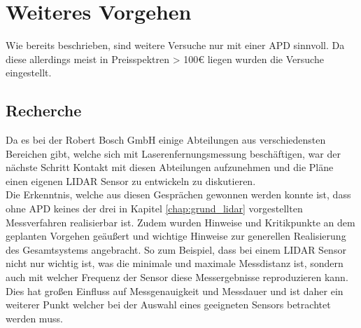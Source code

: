 \section{Weiteres Vorgehen}
Wie bereits beschrieben, sind weitere Versuche nur mit einer \ac{APD} sinnvoll. Da diese allerdings meist in Preisspektren > 100€ liegen wurden die Versuche eingestellt.
\subsection{Recherche}
Da es bei der Robert Bosch GmbH einige Abteilungen aus verschiedensten Bereichen gibt, welche sich mit Laserenfernungsmessung beschäftigen, war der nächste Schritt Kontakt mit diesen Abteilungen aufzunehmen und die Pläne einen eigenen \ac{LIDAR} Sensor zu entwickeln zu diskutieren. \\ 
Die Erkenntnis, welche aus diesen Gesprächen gewonnen werden konnte ist, dass ohne \ac{APD} keines der drei in Kapitel \ref{chap:grund_lidar} vorgestellten Messverfahren realisierbar ist. Zudem wurden Hinweise und Kritikpunkte an dem geplanten Vorgehen geäußert und wichtige Hinweise zur generellen Realisierung des Gesamtsystems angebracht. So zum Beispiel, dass bei einem \ac{LIDAR} Sensor nicht nur wichtig ist, was die minimale und maximale Messdistanz ist, sondern auch mit welcher Frequenz der Sensor diese Messergebnisse reproduzieren kann. Dies hat großen Einfluss auf Messgenauigkeit und Messdauer und ist daher ein weiterer Punkt welcher bei der Auswahl eines geeigneten Sensors betrachtet werden muss.
